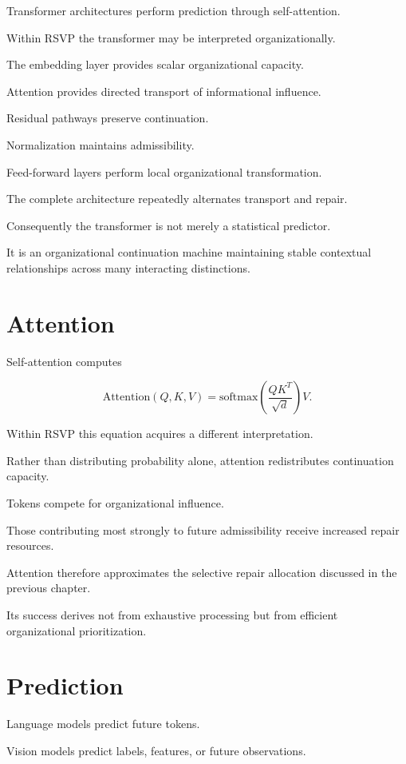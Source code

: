 \documentclass[11pt,oneside]{book}
\numberwithin{equation}{chapter}
\theoremstyle{definition}
\theoremstyle{plain}
\begin{document}
Transformer architectures perform prediction through self-attention.

Within RSVP the transformer may be interpreted organizationally.

The embedding layer provides scalar organizational capacity.

Attention provides directed transport of informational influence.

Residual pathways preserve continuation.

Normalization maintains admissibility.

Feed-forward layers perform local organizational transformation.

The complete architecture repeatedly alternates transport and repair.

Consequently the transformer is not merely a statistical predictor.

It is an organizational continuation machine maintaining stable contextual
relationships across many interacting distinctions.

\section{Attention}

Self-attention computes

\[
\mathrm{Attention}(Q,K,V)
=
\mathrm{softmax}
\left(
\frac{QK^T}
{\sqrt d}
\right)V.
\]

Within RSVP this equation acquires a different interpretation.

Rather than distributing probability alone, attention redistributes
continuation capacity.

Tokens compete for organizational influence.

Those contributing most strongly to future admissibility receive increased
repair resources.

Attention therefore approximates the selective repair allocation discussed
in the previous chapter.

Its success derives not from exhaustive processing but from efficient
organizational prioritization.

\section{Prediction}

Language models predict future tokens.

Vision models predict labels, features, or future observations.
\end{document}
